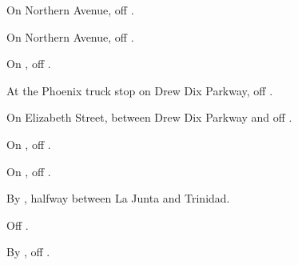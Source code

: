 

\begin{LocationList}

On Northern Avenue, off  .

On Northern Avenue, off  .

On , off  .

At the Phoenix truck stop on Drew Dix Parkway, off  .

On Elizabeth Street, between Drew Dix Parkway and  off  .

On , off  .

On , off  .

By , halfway between La Junta and Trinidad.

Off  .

By , off  .

\end{LocationList}
